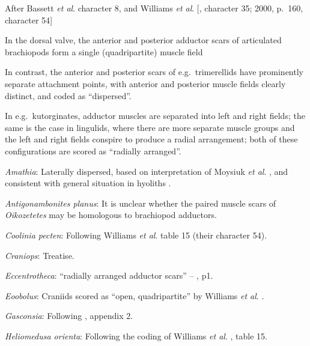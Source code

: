 \documentclass[openany]{book}
\theoremstyle{definition}
\theoremstyle{definition}
\theoremstyle{definition}
\theoremstyle{remark}
\begin{document}
After Bassett \emph{et al}.
\citeyearpar{Bassett2001Functionalmorphology} character 8, and Williams
\emph{et al}. {[}\citet{Williams1996Asupra}, character 35; 2000, p.~160,
character 54{]}

In the dorsal valve, the anterior and posterior adductor scars of
articulated brachiopods form a single (quadripartite) muscle field
\citep[p.~201]{Williams2000LinguliformeaCraniiformea}

In contrast, the anterior and posterior scars of e.g.~trimerellids have
prominently separate attachment points, with anterior and posterior
muscle fields clearly distinct, and coded as ``dispersed''.

In e.g.~kutorginates, adductor muscles are separated into left and right
fields; the same is the case in lingulids, where there are more separate
muscle groups and the left and right fields conspire to produce a radial
arrangement; both of these configurations are scored as ``radially
arranged''.

\hypertarget{Amathia-coding-76}{}
\emph{Amathia}: Laterally dispersed, based on interpretation of Moysiuk
\emph{et al}. \citeyearpar{Moysiuk2017Hyolithsare}, and consistent with
general situation in hyoliths \citep[see][]{Dzik1980Ontogenyof}.

\hypertarget{Antigonambonites_planus-coding-76}{}
\emph{Antigonambonites planus}: It is unclear whether the paired muscle
scars of \emph{Oikozetetes} may be homologous to brachiopod adductors.

\hypertarget{Coolinia_pecten-coding-76}{}
\emph{Coolinia pecten}: Following Williams \emph{et al}.
\citeyearpar{Williams2000LinguliformeaCraniiformea} table 15 (their
character 54).

\hypertarget{Craniops-coding-76}{}
\emph{Craniops}: Treatise.

\hypertarget{Eccentrotheca-coding-76}{}
\emph{Eccentrotheca}: ``radially arranged adductor scars'' --
\citet{Bassett2017Earliestontogeny}, p1.

\hypertarget{Eoobolus-coding-76}{}
\emph{Eoobolus}: Craniids scored as ``open, quadripartite'' by Williams
\emph{et al}. \citeyearpar{Williams1996Asupra}.

\hypertarget{Gasconsia-coding-76}{}
\emph{Gasconsia}: Following \citet{Williams1998Thediversity}, appendix
2.

\hypertarget{Heliomedusa_orienta-coding-76}{}
\emph{Heliomedusa orienta}: Following the coding of Williams \emph{et
al}. \citeyearpar{Williams2000LinguliformeaCraniiformea}, table 15.
\end{document}
